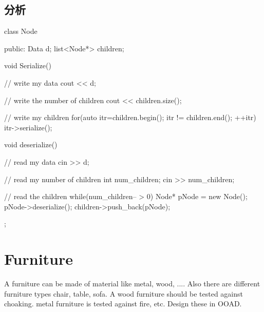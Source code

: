 \subsection{分析}
\begin{Code}
	class Node {
	public:
		Data d;
		list<Node*> children;
		
		void Serialize() {
			// write my data
			cout << d;
			
			// write the number of children
			cout << children.size();
			
			// write my children
			for(auto itr=children.begin(); itr != children.end(); ++itr) itr->serialize();
		}
		
		void deserialize() {
			// read my data
			cin >> d;
			
			// read my number of children
			int num_children;
			cin >> num_children;
			
			// read the children
			while(num_children-- > 0) {
				Node* pNode = new Node();
				pNode->deserialize();
				children->push_back(pNode);
			}
		}
	};
\end{Code}

\section{Furniture}
A furniture can be made of material like metal, wood, .... Also there are different furniture types chair, table, sofa. A wood furniture should be tested against choaking. metal 
furniture is tested against fire, etc. Design these in OOAD.

